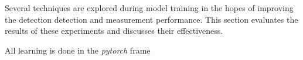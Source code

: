 Several techniques are explored during model training in the hopes of improving the detection detection and measurement performance. 
This section evaluates the results of these experiments and discusses their effectiveness.

All learning is done in the \emph{pytorch} frame
